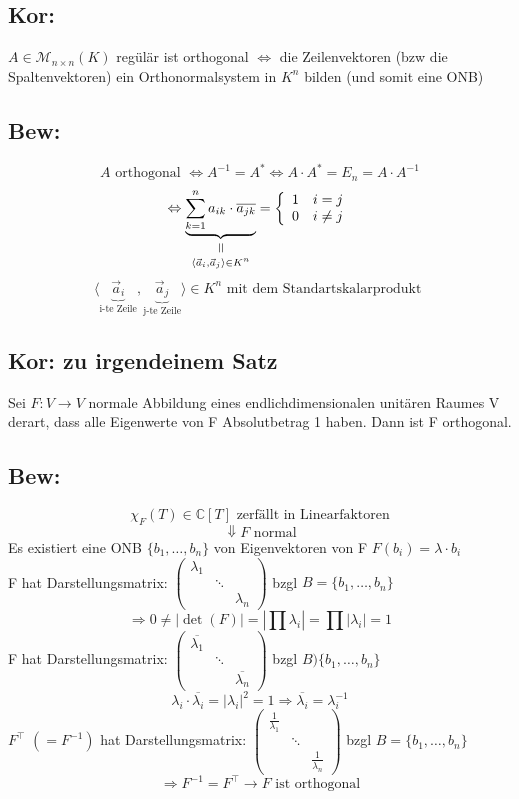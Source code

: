 \documentclass[titlepage,12pt,a4paper,ngerman]{report}
\newcommand{\verteq}{\rotatebox{90}{$\,=$}}
\newcommand{\equalto}[2]{\underset{\scriptstyle\overset{\mkern4mu\verteq}{#2}}{#1}}
\newcommand{\tx}[1]{\textrm{#1}}
\newcommand{\ub}[1]{\underbrace{#1}}
\newcommand{\basis}[3]{\{#1_{#2}, \dots, #1_{#3}\}}
\newcommand{\casess}[4]{\left\{ \begin{array}{ll} {#1} & {#2} \\ {#3} & {#4} \end{array} \right.}
\newcommand{\ska}[2]{\langle #1 , #2 \rangle}
\begin{document}
\subsection{Kor:}
$ A \in \mathcal{M}_{n \times n} (K) $ regülär ist orthogonal $ \Leftrightarrow $ die  Zeilenvektoren (bzw die Spaltenvektoren) ein Orthonormalsystem in $ K^n $ bilden (und somit eine ONB)
\subsection{Bew:}
$$ A \tx{ orthogonal } \Leftrightarrow A^{-1} = A^* \Leftrightarrow A \cdot A^* = E_n = A \cdot A^{-1}$$ $$\Leftrightarrow \equalto{\ub{\sum_{k=1}^{n} a_{ik} \cdot \overline{a_{jk}}}}{\ska{\vec{a}_i}{\vec{a}_j} \in K^n} = \casess{1}{i=j}{0}{i\neq j} $$
$$\ska{\ub{\vec{a}_i}_{\tx{i-te Zeile}}}{\ub{\vec{a}_j}_{\tx{j-te Zeile}}} \in K^n \tx{ mit dem Standartskalarprodukt } $$
\subsection{Kor: zu irgendeinem Satz}
Sei $ F: V \to V $ normale Abbildung eines endlichdimensionalen unitären Raumes V derart, dass alle Eigenwerte von F Absolutbetrag 1 haben. Dann ist F orthogonal.

\subsection{Bew:}
$$ \chi_{F}(T) \in \mathbb{C} [T] \tx{ zerfällt in Linearfaktoren}$$
$$\Downarrow F \tx{ normal}$$
Es existiert eine ONB $ \basis{b}{1}{n} $ von Eigenvektoren von F $ F(b_i) = \lambda \cdot b_i $\\[5pt]
F hat Darstellungsmatrix:
$\begin{pmatrix}
\lambda_1\\
& \ddots \\
& & \lambda_n
\end{pmatrix} $
bzgl $ B = \basis{b}{1}{n} $\\[5pt]
$$\Rightarrow 0 \neq |\det(F)| = | \prod  \lambda_i | = \prod | \lambda_i| = 1$$
F hat Darstellungsmatrix:
$\begin{pmatrix}
\overline{\lambda_1}\\
& \ddots \\
& & \overline{\lambda_n}
\end{pmatrix}$
bzgl $ B ) \basis{b}{1}{n} $\\[5pt]
$$\lambda_i \cdot \overline{\lambda_i} = |\lambda_i|^2 = 1 \Rightarrow \overline{\lambda_i} = \lambda_i^{-1}$$
$ F^\top $ $ (= F^{-1}) $ hat Darstellungsmatrix: $ \begin{pmatrix}
\frac{1}{\lambda_1} \\
& \ddots \\
& & \frac{1}{\lambda_n}
\end{pmatrix} $ bzgl $ B = \basis{b}{1}{n} $ 
$$\Rightarrow F^{-1} = F^\top \rightarrow F \tx{ ist orthogonal}$$
\end{document}
